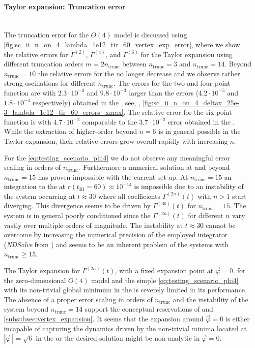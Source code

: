 \paragraph{\frg{} Taylor expansion: Truncation error}\label{paragraph:sc2taylorError}\mbox{}\\
The truncation error for the $O(4)$ model is discussed using \cref{fig:sc_ii_n_on_4_lambda_1e12_tir_60_vertex_exp_error}, where we show the relative errors for $\Gamma^{(2)}$, $\Gamma^{(4)}$, and $\Gamma^{(6)}$ for the Taylor expansion using different truncation orders $m=2n_\mathrm{trunc}$ between $n_\mathrm{trunc}=3$ and $n_\mathrm{trunc}=14$. 
Beyond $n_\mathrm{trunc}=10$ the relative errors for the \nptFunctions{} no longer decrease and we observe rather strong oscillations for different $n_\mathrm{trunc}$.
The errors for the two and four-point function are with $2.3 \cdot 10^{-3}$ and $9.8 \cdot 10^{-3}$ larger than the errors ($4.2 \cdot 10^{-5}$ and $1.8 \cdot 10^{-4}$ respectively) obtained in the \ktScheme{}, see,  \eg{}, \cref{fig:sc_ii_n_on_4_deltax_25e-3_lambda_1e12_tir_60_errors_xmax}. 
The relative error for the six-point function is with $4.7 \cdot 10^{-2}$ comparable to the $3.7 \cdot 10^{-2}$ error obtained in the \ktScheme{}.
While the extraction of higher-order \nptFunctions{} beyond $n = 6$ is in general possible in the Taylor expansion, their relative errors grow overall rapidly with increasing $n$.

For the \ic{} \eqref{eq:testing_scenario_phi4} we do not observe any meaningful error scaling in orders of $n_\mathrm{trunc}$.
Furthermore a numerical solution at and beyond $n_\mathrm{trunc}=15$ has proven impossible with the current set-up.
At $n_\mathrm{trunc}=15$ an \ode{} integration to the \ir{} at $r ( t_\mathrm{IR} = 60 ) \approx 10^{-14}$ is impossible due to an instability of the \ode{} system occurring at $t \approx 30$ where all coefficients $\Gamma^{(2n)}(t)$ with $n>1$ start diverging.
This divergence seems to be driven by $\Gamma^{(30)}(t)$ for $n_\mathrm{trunc}=15$.
The \ode{} system is in general poorly conditioned since the $\Gamma^{(2n)}(t)$ for different $n$ vary vastly over multiple orders of magnitude.
The instability at  $t \approx 30$ cannot be overcome by increasing the numerical precision of the employed \ode{} integrator (\textit{NDSolve} from \WAMXIIwR{}) and seems to be an inherent problem of the \ode{} systems with $n_\mathrm{trunc}\geq15$.

The Taylor expansion for $\Gamma^{(2n)}(t)$, with a fixed expansion point at $\vec{\varphi} = 0$, for the zero-dimensional $O ( 4 )$ model and the simple \ic{} \eqref{eq:testing_scenario_phi4} with its non-trivial global minimum in the \uv{} is severely limited in its performance.
The absence of a proper error scaling in orders of $n_\mathrm{trunc}$ and the instability of the \ode{} system beyond $n_\mathrm{trunc}=14$ support the conceptual reservations of \teRef{} and \cref{subsubsec:vertex_expansion}.
It seems that the expansion around $\vec{\varphi} = 0$ is either incapable of capturing the dynamics driven by the non-trivial minima located at $| \vec{\varphi} \, | = \sqrt{6}$ in the \uv{} or the desired solution might be non-analytic in $\vec{\varphi} = 0$.

